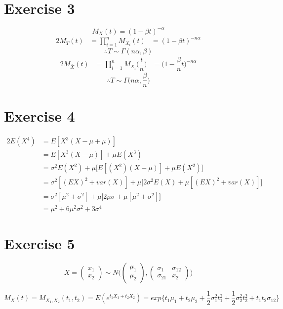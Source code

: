 \documentclass[a4papers]{ctexart}
\begin{document}
\section*{Exercise 3}
\[ M_X(t)=(1-\beta t)^{-\alpha}\]
\begin{alignat*}{2}
    M_T(t) &= \prod_{i=1}^n M_{X_i}(t) 
           &= (1-\beta t)^{-n\alpha}
\end{alignat*}
\[\therefore T \sim \Gamma(n\alpha,\beta)\]
\begin{alignat*}{2}
    M_{\bar{X}}(t) &= \prod_{i=1}^n M_{X_i}\Big(\dfrac{t}{n}\Big)  
           &= \Big(1-\dfrac{\beta}{n} t\Big)^{-n\alpha}
\end{alignat*}
\[\therefore T \sim \Gamma\Big(n\alpha,\dfrac{\beta}{n}\Big)\]


\section*{Exercise 4}
\begin{alignat*}{2}
     E(X^4)&=E[X^3(X-\mu+\mu)]\\
           &=E[X^3(X-\mu)]+\mu E(X^3)\\
           &=\sigma^2 E(X^2)+\mu \Big[ E[(X^2)(X-\mu)] + \mu E(X^2) \Big] \\
           &=\sigma^2 [(EX)^2+var(X)]+\mu \Big[ 2\sigma^2 E(X) + \mu [(EX)^2+var(X)] \Big] \\
           &=\sigma^2 [\mu^2+\sigma^2]+\mu \Big[ 2\mu \sigma + \mu [\mu ^2+\sigma^2] \Big] \\
           &=\mu^2 + 6\mu^2\sigma^2+3\sigma^4
\end{alignat*}

\section*{Exercise 5}
\[X = \begin{pmatrix}x_1 \\ x_2\end{pmatrix} \sim
 N\Big( \begin{pmatrix}\mu_1 \\ \mu_2\end{pmatrix}   ,
        \begin{pmatrix}\sigma_1 & \sigma_{12}\\ \sigma_{21} & x_2\end{pmatrix} \Big)\]

\[ M_X(t)=M_{X_1,X_2}(t_1,t_2)=E(e^{t_1 X_1+t_2 X_2})
=exp\Big\{ t_1\mu _{1}+t_{2}\mu_2+\dfrac {1}{2}\sigma ^{2}_{1}t^{2}_{1}+\dfrac {1}{2}\sigma ^{2}_{2}t^{2}_{2}+t_{1}t_{2}\sigma _{12}\Big\} \]
\end{document}
